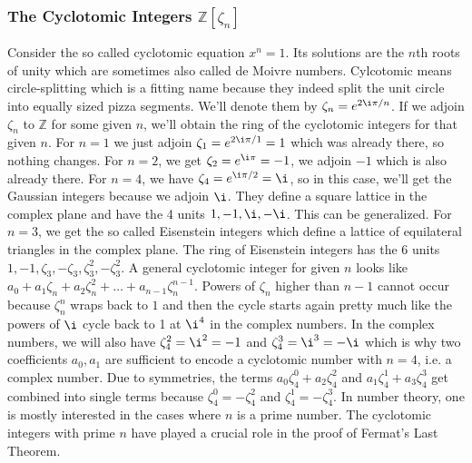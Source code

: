 \subsubsection{The Cyclotomic Integers $\mathbb{Z}[\zeta_n]$}
Consider the so called cyclotomic equation $x^n = 1$. Its solutions are the $n$th roots of unity which are sometimes also called de Moivre numbers. Cylcotomic means circle-splitting which is a fitting name because they indeed split the unit circle into equally sized pizza segments. We'll denote them by $\zeta_n = e^{2 \i \pi / n}$.  If we adjoin $\zeta_n$ to $\mathbb{Z}$ for some given $n$, we'll obtain the ring of the cyclotomic integers for that given $n$. For $n=1$ we just adjoin $\zeta_1 = e^{2 \i \pi / 1} = 1$ which was already there, so nothing changes. For $n=2$, we get $\zeta_2 = e^{\i \pi} = -1$, we adjoin $-1$ which is also already there. For $n=4$, we have $\zeta_4 = e^{\i \pi / 2} = \i$, so in this case, we'll get the Gaussian integers because we adjoin $\i$. They define a square lattice in the complex plane and have the 4 units $1,-1,\i,-\i$. This can be generalized. For $n=3$, we get the so called Eisenstein integers which define a lattice of equilateral triangles in the complex plane. The ring of Eisenstein integers has the 6 units $1, -1, \zeta_3, -\zeta_3, \zeta_3^2, -\zeta_3^2$. A general cyclotomic integer for given $n$ looks like $a_0 + a_1 \zeta_n + a_2 \zeta_n^2 + \ldots + a_{n-1} \zeta_n^{n-1}$. Powers of $\zeta_n$ higher than $n-1$ cannot occur because $\zeta_n^n$ wraps back to $1$ and then the cycle starts again pretty much like the powers of $\i$ cycle back to 1 at $\i^4$ in the complex numbers. In the complex numbers, we will also have $\zeta_4^2 = \i^2 = -1$ and $\zeta_4^3 = \i^3 = -\i$ which is why two coefficients $a_0, a_1$ are sufficient to encode a cyclotomic number with $n=4$, i.e. a complex number. Due to symmetries, the terms $a_0 \zeta_4^0 + a_2 \zeta_4^2$ and $a_1 \zeta_4^1 + a_3 \zeta_4^3$ get combined into single terms because $\zeta_4^0 = -\zeta_4^2$ and $\zeta_4^1 = -\zeta_4^3$. In number theory, one is mostly interested in the cases where $n$ is a prime number. The cyclotomic integers with prime $n$ have played a crucial role in the proof of Fermat's Last Theorem.



